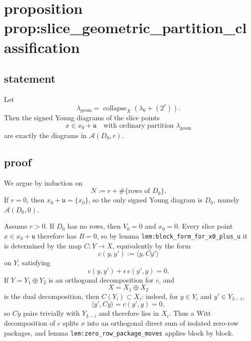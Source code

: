 \documentclass[
]{article}
\begin{document}
\section{proposition
prop:slice\_geometric\_partition\_classification}\label{proposition-propslice_geometric_partition_classification}

\subsection{statement}\label{statement-25}

Let \[
\lambda_{\mathrm{geom}}=\operatorname{collapse}_X(\lambda_0+(2^r)).
\] Then the signed Young diagrams of the slice points \[
x\in x_0+\mathfrak u
\quad\text{with ordinary partition }\lambda_{\mathrm{geom}}
\] are exactly the diagrams in \(\mathcal A(D_0,r)\).

\subsection{proof}\label{proof-25}

We argue by induction on \[
N:=r+\#\{\text{rows of }D_0\}.
\] If \(r=0\), then \(x_0+\mathfrak u=\{x_0\}\), so the only signed
Young diagram is \(D_0\), namely \(\mathcal A(D_0,0)\).

Assume \(r>0\). If \(D_0\) has no rows, then \(V_0=0\) and \(x_0=0\).
Every slice point \(x\in x_0+\mathfrak u\) therefore has \(B=0\), so by
lemma \texttt{lem:block\_form\_for\_x0\_plus\_u} it is determined by the
map \(C:Y\to X\), equivalently by the form \[
c(y,y'):=\langle y,Cy'\rangle
\] on \(Y\), satisfying \[
c(y,y')+\epsilon\,c(y',y)=0.
\] If \(Y=Y_1\oplus Y_2\) is an orthogonal decomposition for \(c\), and
\[
X=X_1\oplus X_2
\] is the dual decomposition, then \(C(Y_i)\subset X_i\): indeed, for
\(y\in Y_i\) and \(y'\in Y_{3-i}\), \[
\langle y',Cy\rangle=c(y',y)=0,
\] so \(Cy\) pairs trivially with \(Y_{3-i}\) and therefore lies in
\(X_i\). Thus a Witt decomposition of \(c\) splits \(x\) into an
orthogonal direct sum of isolated zero-row packages, and lemma
\texttt{lem:zero\_row\_package\_moves} applies block by block.
\end{document}
